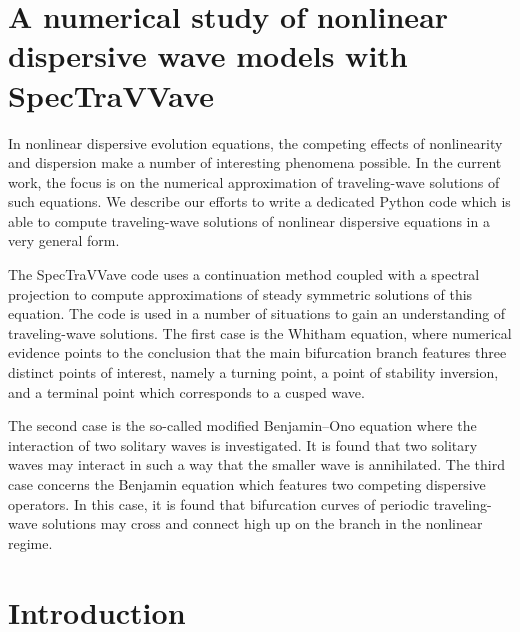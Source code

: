 \section{A numerical study of nonlinear dispersive wave models with SpecTraVVave}

In nonlinear dispersive evolution equations, the competing effects of nonlinearity and dispersion 
make a number of interesting phenomena possible. In the current work, the focus is on the numerical
approximation of traveling-wave solutions of such equations.
We describe our efforts to write a dedicated \textsf{Python}
code which is able to compute traveling-wave solutions of nonlinear
dispersive equations in a very general form.

The \textsf{SpecTraVVave} code uses a continuation method coupled with a spectral projection
to compute approximations of steady symmetric solutions of this equation.
The code is used in a number of situations to gain an
understanding of traveling-wave solutions. The first case is the Whitham
equation, where numerical evidence points to the conclusion that the main 
bifurcation branch features three distinct points of interest, namely a turning point, 
a point of stability inversion, and a terminal point which corresponds to a cusped wave.

The second case is the so-called modified Benjamin--Ono equation where
the interaction of two solitary waves is investigated. It is found
that two solitary waves may interact in such a way
that the smaller wave is annihilated. The third case concerns
the Benjamin equation which features two competing dispersive operators.
In this case, it is found that bifurcation curves of periodic traveling-wave
solutions may cross and connect high up on the branch in the nonlinear regime.


\section{Introduction}
\label{intro}

